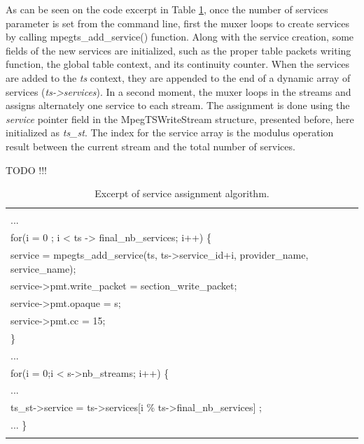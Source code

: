 \documentclass[
	12pt,				%
	openright,			%
	twoside,			%
	a4paper,			%
	brazil,
	french,				%
	english
	]{abntex2}
\begin{document}
As can be seen on the code excerpt in Table \ref{tab_service_assignment}, once the number of services parameter is set from the command line, first the muxer loops to create services by calling mpegts\_add\_service() function. Along with the service creation, some fields of the new services are initialized, such as the proper table packets writing function, the global table context, and its continuity counter. When the services are added to the \textit{ts} context, they are appended to the end of a dynamic array of services (\textit{ts->services}). In a second moment, the muxer loops in the streams and assigns alternately one service to each stream. The assignment is done using the \textit{service} pointer field in the MpegTSWriteStream structure, presented before, here initialized as \textit{ts\_st}. The index for the service array is the modulus operation result between the current stream and the total number of services.

TODO !!!

\begin{table}[!htpd]
\label{tab_service_assignment}
\caption{ Excerpt of service assignment algorithm.}
\begin{center}
\begin{tabular}{|l|}
\hline
\\
...\\
for(i = 0 ; i < ts -> final\_nb\_services; i++) \{\\
service = mpegts\_add\_service(ts, ts->service\_id+i, provider\_name, service\_name);\\
service->pmt.write\_packet = section\_write\_packet;\\
service->pmt.opaque = s;\\
service->pmt.cc = 15;\\
\}\\
...\\
for(i = 0;i < s->nb\_streams; i++) \{\\
...\\
ts\_st->service = ts->services[i \% ts->final\_nb\_services] ;\\
...
\}\\
\\
\hline
\end{tabular}
\end{center}
\end{table}

\end{document}
